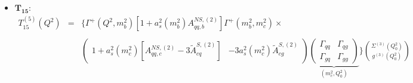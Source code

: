 \documentclass[10pt,a4paper]{article}
\begin{document}
\begin{itemize}
\item $\mathbf{T_{15}}$:
\begin{equation}
\begin{array}{rcl}
T^{(5)}_{15}(Q^2)&=&\displaystyle \Bigg\{\Gamma^{+}(Q^2,m_b^2)[1+a_s^2(m_b^2)A_{qq,b}^{N\!S,(2)}]\Gamma^{+}(m_b^2,m_c^2)\times\\
\\
& & \displaystyle \begin{pmatrix} 1+a_s^2(m_c^2)[A_{qq,c}^{N\!S,(2)}-3\tilde{A}^{S,(2)}_{cq}] & -3a_s^2(m_c^2)\tilde{A}^{S,(2)}_{cg}\end{pmatrix}\underbrace{\begin{pmatrix}\Gamma_{qq}& \Gamma_{qg} \\ \Gamma_{gq} & \Gamma_{gg}\end{pmatrix}}_{(m_c^2,Q_0^2)}\Bigg\}{\Sigma^{(3)}(Q_0^2) \choose g^{(3)}(Q_0^2)}
\end{array}
\end{equation}


\end{itemize}
\end{document}
